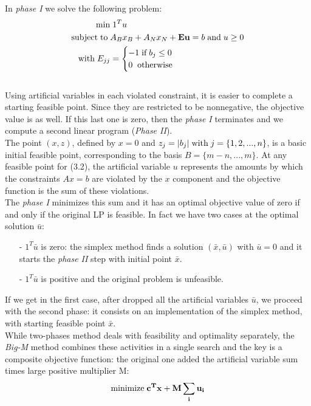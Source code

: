 \documentclass[a4paper,10 pt,titlepage,twoside]{book}
\theoremstyle{plain}
\theoremstyle{definition}
\theoremstyle{remark}
\begin{document}
In \textit{phase I} we solve the following problem:
\begin{equation}
\begin{split}
\min &\;1^{T}u\\
\text{subject\;to\;}&A_{B}x_{B}+A_{N}x_{N} + \textbf{Eu} = b\;\text{and\;} u\geq 0\\
\text{with\;} E_{jj}& =\begin{cases} -1\;\text{if\;} b_{j} \leq 0\\
0\;\; \text{otherwise}
\end{cases}   
\end{split}
\end{equation} \\
Using artificial variables in each violated constraint, it is easier to complete a starting feasible point. Since they are restricted to be nonnegative, the objective value is as well. If this last one is zero, then the \textit{phase I} terminates and we compute a second linear program (\textit{Phase II}).\\
The point $(x,z)$, defined by $x = 0$ and $z_{j} = |b_{j}| \text{\;with\;}j =\{1,2,...,n\}$, is a basic initial feasible point, corresponding to the basis $B = \{m-n,...,m\}$. At any feasible point for (3.2), the artificial variable $u$ represents the amounts by which the constraints $Ax = b$ are violated by the $x$ component and the objective function is the sum of these violations. \\
The \textit{phase I} minimizes this sum and it has an optimal objective value of zero if and only if the original LP is feasible. In fact we have two cases at the optimal solution $\bar{u}$: 
\begin{itemize}
	\item[-]$1^{T}\bar{u}$ is zero: the simplex method finds a solution $(\bar{x},\bar{u})$ with $\bar{u}=0$ and it starts the \textit{phase II} step with initial point $\bar{x}$.
	\item[-]$1^{T}\bar{u}$ is positive and the original problem is unfeasible.
\end{itemize}
If we get in the first case, after dropped all the artificial variables $\bar{u}$, we proceed with the second phase: it consists on an implementation of the simplex method, with starting feasible point $\bar{x}$.\\ 
While two-phases method deals with feasibility and optimality separately, the \textit{Big-M} method combines these activities in a single search and the key is a composite objective function: the original one added the artificial variable sum times  large positive multiplier M:\\
\begin{equation}
\text{minimize\;}\mathbf{c^{T}x+M \sum_{i}{u}_{i}}\\
\end{equation}  
\end{document}
